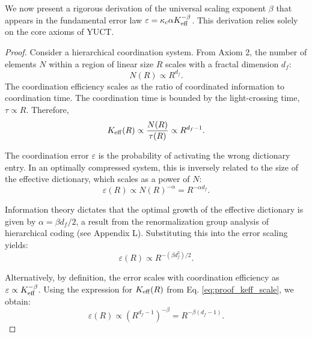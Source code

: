 \documentclass[12pt,a4paper]{article}
\newcommand{\Keff}[1][]{K_{\mathrm{eff}\if\relax\detokenize{#1}\relax\else,#1\fi}}   %
\begin{document}
	We now present a rigorous derivation of the universal scaling exponent \(\beta\) that appears in the fundamental error law \(\varepsilon = \kappa_c \alpha \Keff^{-\beta}\). This derivation relies solely on the core axioms of YUCT.
	
	\begin{proof}
		Consider a hierarchical coordination system. From Axiom 2, the number of elements \(N\) within a region of linear size \(R\) scales with a fractal dimension \(d_f\):
		\begin{equation}
			N(R) \propto R^{d_f}.
			\label{eq:proof_fractal}
		\end{equation}
		The coordination efficiency scales as the ratio of coordinated information to coordination time. The coordination time is bounded by the light-crossing time, \(\tau \propto R\). Therefore,
		\begin{equation}
			\Keff(R) \propto \frac{N(R)}{\tau(R)} \propto R^{d_f - 1}.
			\label{eq:proof_keff_scale}
		\end{equation}
		
		The coordination error \(\varepsilon\) is the probability of activating the wrong dictionary entry. In an optimally compressed system, this is inversely related to the size of the effective dictionary, which scales as a power of \(N\):
		\begin{equation}
			\varepsilon(R) \propto N(R)^{-\alpha} = R^{-\alpha d_f}.
			\label{eq:proof_error_scale}
		\end{equation}
		
		Information theory dictates that the optimal growth of the effective dictionary is given by \(\alpha = \beta d_f / 2\), a result from the renormalization group analysis of hierarchical coding (see Appendix L). Substituting this into the error scaling yields:
		\begin{equation}
			\varepsilon(R) \propto R^{-(\beta d_f^2)/2}.
			\label{eq:proof_error_keff1}
		\end{equation}
		
		Alternatively, by definition, the error scales with coordination efficiency as \(\varepsilon \propto \Keff^{-\beta}\). Using the expression for \(\Keff(R)\) from Eq. \eqref{eq:proof_keff_scale}, we obtain:
		\begin{equation}
			\varepsilon(R) \propto \left(R^{d_f - 1}\right)^{-\beta} = R^{-\beta(d_f - 1)}.
			\label{eq:proof_error_keff2}
		\end{equation}
		

\end{proof}
\end{document}
